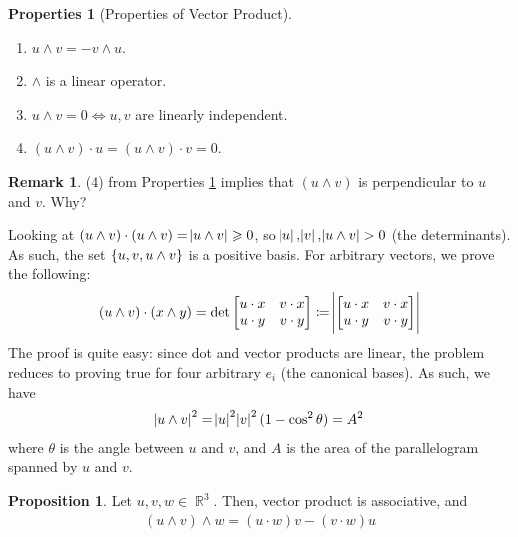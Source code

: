\documentclass{amsart} %
\theoremstyle{mytheoremstyle}
\theoremstyle{definition}
\newtheorem{proposition}[definition]{Proposition}
\newtheorem{properties}[definition]{Properties}
\newtheorem{remark}[definition]{Remark}
\numberwithin{equation}{section}
\DeclareMathOperator{\R}{\mathbb{R}}
\DeclareMathOperator{\1}{\mathbbm{1}}
\renewcommand{\geq}{\geqslant}
\renewcommand{\geq}{\geqslant}
\begin{document}
\begin{properties}[Properties of Vector Product]
	\label{propertiesofvectorproduct}
	\begin{enumerate}
		\item $u \wedge v = -v \wedge u$.
		\item $\wedge $ is a linear operator.
		\item $u \wedge v = 0 \iff u, v$ are linearly independent.
		\item $(u \wedge v) \cdot u = (u \wedge v) \cdot v = 0$.
	\end{enumerate}
\end{properties}


\begin{remark}
	(4) from Properties \ref{propertiesofvectorproduct} implies that $(u \wedge v)$ is perpendicular to $u$ and $v$. Why?
	
	Looking at $(u \wedge v) \cdot (u \wedge v) = \abs{u \wedge v} \geq 0$, so $\abs{u},\abs{v},\abs{u \wedge v} >0$ (the determinants). As such, the set $\set{u,v,u \wedge v} $ is a positive basis. For arbitrary vectors, we prove the following:
	\begin{align}
	\label{eqpropertyofscalarproductofvectorproducts}
		(u \wedge v) \cdot (x \wedge y) = \det \begin{bmatrix*}[c]
			u \cdot x & v \cdot x \\ u \cdot y & v \cdot y \\
		\end{bmatrix*} \coloneqq \abs{\begin{bmatrix*}[c]
			u \cdot x & v \cdot x \\ u \cdot y & v \cdot y \\
			\end{bmatrix*}}
	\end{align}
	The proof is quite easy: since dot and vector products are linear, the problem reduces to proving true for four arbitrary $e_i$ (the canonical bases). As such, we have
	\begin{align*}
		\abs{u \wedge v}^2 = \abs{u}^2 \abs{v}^2 (1- \cos^2 \theta) = A^2
	\end{align*}
	where $\theta$ is the angle between $u$ and $v$, and $A$ is the area of the parallelogram spanned by $u$ and $v$.
\end{remark}


\begin{proposition}
	\label{propvectorproductformula}
	Let $u,v,w \in \R^3$. Then, vector product is associative, and
	\begin{align}
		\label{eqvectorproductassociative}
		(u \wedge v) \wedge w = (u \cdot w ) v - (v \cdot w ) u
	\end{align}
\end{proposition}
\end{document}
